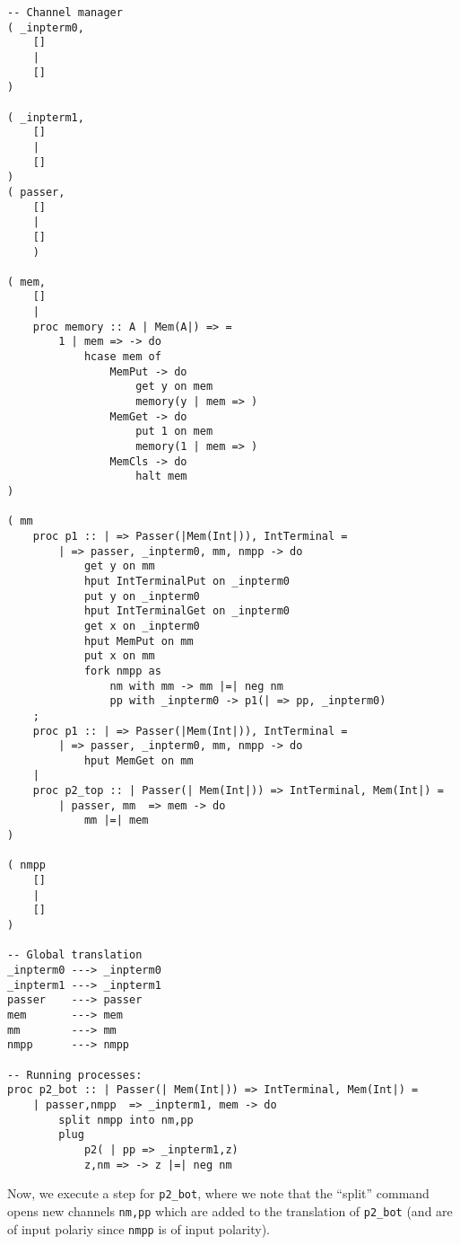 \documentclass{article}
\theoremstyle{plain}%
\theoremstyle{definition}
\theoremstyle{remark}
\begin{document}
\begin{verbatim}
-- Channel manager
( _inpterm0,  
    []
    |
    []
)

( _inpterm1,  
    []
    |
    []
)
( passer,
    []
    |
    []
    )

( mem,
    []
    |
    proc memory :: A | Mem(A|) => =
        1 | mem => -> do
            hcase mem of
                MemPut -> do
                    get y on mem
                    memory(y | mem => )
                MemGet -> do
                    put 1 on mem
                    memory(1 | mem => )
                MemCls -> do
                    halt mem
)

( mm
    proc p1 :: | => Passer(|Mem(Int|)), IntTerminal = 
        | => passer, _inpterm0, mm, nmpp -> do
            get y on mm
            hput IntTerminalPut on _inpterm0
            put y on _inpterm0
            hput IntTerminalGet on _inpterm0
            get x on _inpterm0
            hput MemPut on mm
            put x on mm
            fork nmpp as
                nm with mm -> mm |=| neg nm 
                pp with _inpterm0 -> p1(| => pp, _inpterm0)
    ;
    proc p1 :: | => Passer(|Mem(Int|)), IntTerminal = 
        | => passer, _inpterm0, mm, nmpp -> do
            hput MemGet on mm 
    |
    proc p2_top :: | Passer(| Mem(Int|)) => IntTerminal, Mem(Int|) =
        | passer, mm  => mem -> do
            mm |=| mem
)

( nmpp
    []
    |
    []
)

-- Global translation
_inpterm0 ---> _inpterm0 
_inpterm1 ---> _inpterm1 
passer    ---> passer 
mem       ---> mem
mm        ---> mm
nmpp      ---> nmpp

-- Running processes:
proc p2_bot :: | Passer(| Mem(Int|)) => IntTerminal, Mem(Int|) =
    | passer,nmpp  => _inpterm1, mem -> do
        split nmpp into nm,pp
        plug
            p2( | pp => _inpterm1,z)
            z,nm => -> z |=| neg nm
\end{verbatim}
Now, we execute a step for \verb|p2_bot|, where we note that the
    ``split'' command opens new channels \verb|nm,pp| which are added to
    the translation of \verb|p2_bot| (and are of input polariy since \verb|nmpp| is of input polarity).
\end{document}

